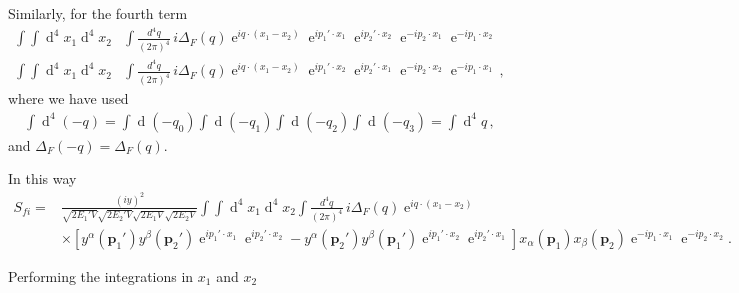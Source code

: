 Similarly, for the fourth term
\begin{align}
    \int\int \operatorname{d}^4x_1 \operatorname{d}^4x_2&
\int\frac{d^4q}{(2\pi)^4}\,i\Delta_F(q)\operatorname{e}^{i q\cdot(x_1-x_2)}
\operatorname{e}^{i p_1'\cdot x_1}\operatorname{e}^{i p_2'\cdot x_2}\operatorname{e}^{-i p_2\cdot x_1}\operatorname{e}^{-i p_1\cdot x_2} \nonumber\\
    \int\int \operatorname{d}^4x_1 \operatorname{d}^4x_2&
\int\frac{d^4q}{(2\pi)^4}\,i\Delta_F(q)\operatorname{e}^{i q\cdot(x_1-x_2)}
\operatorname{e}^{i p_1'\cdot x_2}\operatorname{e}^{i p_2'\cdot x_1}\operatorname{e}^{-i p_2\cdot x_2}\operatorname{e}^{-i p_1\cdot x_1}\,,
\end{align}
where we have used
\begin{align}
  \int\operatorname{d}^4(-q)=\int\operatorname{d}(-q_0)\int\operatorname{d}(-q_1)\int\operatorname{d}(-q_2)\int\operatorname{d}(-q_3)=\int \operatorname{d}^4q\,,
\end{align}
and $\Delta_F(-q)=\Delta_F(q)$.

In this way
\begin{align}
\label{eq:intermediate}
   S_{fi}
    =&\frac{(iy)^2 }{\sqrt{2 E_1'V}\sqrt{2 E_2'V}\sqrt{2 E_1V}\sqrt{2 E_2V}}\int\int \operatorname{d}^4x_1 \operatorname{d}^4x_2
\int\frac{d^4q}{(2\pi)^4}\,i\Delta_F(q)\operatorname{e}^{i q\cdot(x_1-x_2)} \nonumber\\
&
 \times \left[ y^{\alpha}(\mathbf{p}_1')y^{\beta}(\mathbf{p}_2')\operatorname{e}^{i p_1'\cdot x_1}\operatorname{e}^{i p_2'\cdot x_2}
         - y^{\alpha}(\mathbf{p}_2')y^{\beta}(\mathbf{p}_1')\operatorname{e}^{i p_1'\cdot x_2}\operatorname{e}^{i p_2'\cdot x_1} 
  \right]x_{\alpha}(\mathbf{p}_1)x_{\beta}(\mathbf{p}_2)\operatorname{e}^{-i p_1\cdot x_1}\operatorname{e}^{-i p_2\cdot x_2}.
\end{align}

Performing the integrations in $x_1$ and $x_2$


